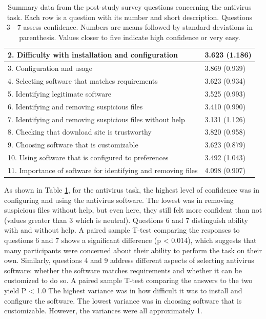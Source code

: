 \begin{table}[ht]
\begin{tabular}{|ll|}
\hline
2. Difficulty with installation and configuration             & 3.623 (1.186) \\ \hline
3. Configuration and usage                                    & 3.869 (0.939) \\ \hline
4. Selecting software that matches requirements               & 3.623 (0.934) \\ \hline
5. Identifying legitimate software                            & 3.525 (0.993) \\ \hline
6. Identifying and removing suspicious files                  & 3.410 (0.990) \\ \hline
7. Identifying and removing suspicious files without help      & 3.131 (1.126) \\ \hline
8. Checking that download site is trustworthy                 & 3.820 (0.958) \\ \hline
9. Choosing software that is customizable                     & 3.623 (0.879) \\ \hline
10. Using software that is configured to preferences          & 3.492 (1.043) \\ \hline
11. Importance of software for identifying and removing files & 4.098 (0.907) \\ \hline
\end{tabular}
\caption{Summary data from the post-study survey questions concerning the antivirus task. Each
row is a question with its number and short description. Questions 3 - 7 assess confidence. Numbers are means followed by standard deviations in parenthesis. Values closer to five indicate high confidence or very easy.}
\label{tab:postavefficacy}
\end{table}

As shown in Table \ref{tab:postavefficacy}, for the antivirus task, the highest level of confidence was in configuring and using the antivirus software. The lowest was in removing suspicious files without help, but even here, they still felt more confident than not (values greater than 3 which is neutral). Questions 6 and 7 distinguish ability with and without help. A paired sample T-test comparing the responses to questions 6 and 7 shows a significant difference (p < 0.014), which suggests that many participants were concerned about their ability to perform the task on their own. Similarly, questions 4 and 9 address different aspects of selecting antivirus software: whether the software matches requirements and whether
it can be customized to do so. A paired sample T-test comparing the answers to the two yield
P < 1.0 The highest variance was in how difficult it was to install and configure the software. The lowest variance was in choosing software that is customizable. However, the variances were all approximately 1.

